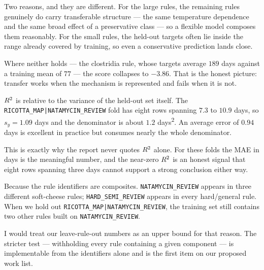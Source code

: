 \begin{questionbox}[title=``Why does Random Forest still score well after you hold out a rule?'']
Two reasons, and they are different. For the large rules, the remaining
rules genuinely do carry transferable structure --- the same temperature
dependence and the same broad effect of a preservative class --- so a
flexible model composes them reasonably. For the small rules, the held-out
targets often lie inside the range already covered by training, so even a
conservative prediction lands close.

Where neither holds --- the clostridia rule, whose targets average $189$
days against a training mean of $77$ --- the score collapses to $-3.86$.
That is the honest picture: transfer works when the mechanism is
represented and fails when it is not.
\end{questionbox}

\begin{questionbox}[title=``Why is one fold's $\rsq$ negative when its MAE is under a day?'']
$\rsq$ is relative to the variance of the held-out set itself. The
\texttt{RICOTTA\_MAP|NATAMYCIN\_REVIEW} fold has eight rows spanning $7.3$
to $10.9$ days, so $s_y = 1.09$ days and the denominator is about $1.2$
days\textsuperscript{2}. An average error of $0.94$ days is excellent in
practice but consumes nearly the whole denominator.

This is exactly why the report never quotes $\rsq$ alone. For these folds
the MAE in days is the meaningful number, and the near-zero $\rsq$ is an
honest signal that eight rows spanning three days cannot support a strong
conclusion either way.
\end{questionbox}

\begin{questionbox}[title=``How can different generation rules still share information?'']
Because the rule identifiers are composites. \texttt{NATAMYCIN\_REVIEW}
appears in three different soft-cheese rules; \texttt{HARD\_SEMI\_REVIEW}
appears in every hard/general rule. When we hold out
\texttt{RICOTTA\_MAP|NATAMYCIN\_REVIEW}, the training set still contains
two other rules built on \texttt{NATAMYCIN\_REVIEW}.

I would treat our leave-rule-out numbers as an upper bound for that reason.
The stricter test --- withholding every rule containing a given component
--- is implementable from the identifiers alone and is the first item on
our proposed work list.
\end{questionbox}

